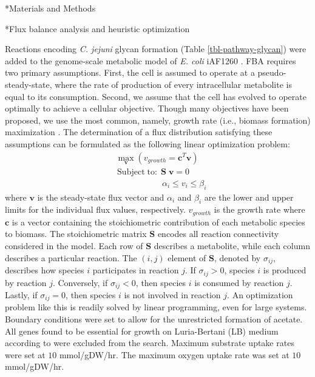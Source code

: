 \documentclass[12pt]{article}
\makeatletter
\renewcommand\subsection{\@startsection
	{subsection}{2}{0mm}
	{-0.05in}
	{-0.5\baselineskip}
	{\normalfont\normalsize\bfseries}}
\renewcommand\section{\@startsection
	{subsection}{2}{0mm}
	{-0.2in}
	{0.05\baselineskip}
	{\normalfont\large\bfseries}}
\makeatother
\begin{document}
\newpage
\section*{Materials and Methods}

\subsection*{Flux balance analysis and heuristic optimization}

Reactions encoding \textit{C. jejuni} glycan formation (Table \ref{tbl-pathway-glycan}) were added to the genome-scale metabolic model of \textit{E. coli} iAF1260 \cite{2007-feist-reed-hatzimanikatis-palsson-MolSysBio}. 
FBA requires two primary assumptions. 
First, the cell is assumed to operate at a pseudo-steady-state, where the rate of production of every intracellular metabolite is equal to its consumption. 
Second, we assume that the cell has evolved to operate optimally to achieve a cellular objective. 
Though many objectives have been proposed, we use the most common, namely, growth rate (i.e., biomass formation) maximization \cite{2007-schuetz-sauer-MolSysBio}. 
The determination of a flux distribution satisfying these assumptions can be formulated as the following linear optimization problem:
\begin{align*}
    & \max_{\boldsymbol{v}}{} \! \left( v_{growth} = \boldsymbol{c}^T \boldsymbol{v} \right)  \\
    & \, \mathrm{Subject \; to:} \;\boldsymbol{S} \; \boldsymbol{v} = 0 \\
    & \qquad\qquad\quad\;\, \alpha_i \leq v_i \leq \beta_i
\end{align*}
where $\boldsymbol{v}$ is the steady-state flux vector and $\alpha_i$ and $\beta_i$ are the lower and upper limits for the individual flux values, respectively. 
$v_{growth}$ is the growth rate where $\boldsymbol{c}$ is a vector containing the stoichiometric contribution of each metabolic species to biomass. 
The stoichiometric matrix $\boldsymbol{S}$ encodes all reaction connectivity considered in the model. 
Each row of $\boldsymbol{S}$ describes a metabolite, while each column describes a particular reaction. 
The $(i,j)$ element of $\boldsymbol{S}$, denoted by $\sigma_{ij}$, describes how species $i$ participates in reaction $j$. 
If $\sigma_{ij}>0$, species $i$ is produced by reaction $j$. 
Conversely, if $\sigma_{ij}<0$, then species $i$ is consumed by reaction $j$. 
Lastly, if $\sigma_{ij}=0$, then species $i$ is not involved in reaction $j$. 
An optimization problem like this is readily solved by linear programming, even for large systems. 
Boundary conditions were set to allow for the unrestricted formation of acetate. 
All genes found to be essential for growth on Luria-Bertani (LB) medium according to \cite{2006-baba-tomita-mori-MolSysBio} were excluded from the search. 
Maximum substrate uptake rates were set at $10$ mmol/gDW/hr. 
The maximum oxygen uptake rate was set at $10$ mmol/gDW/hr. 
\end{document}
